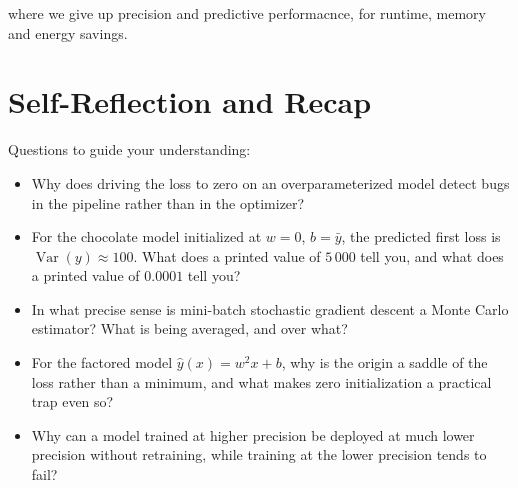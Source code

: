 \vfill
{} where we give up precision and predictive performacnce, for runtime, memory and energy savings.






\newpage
\section{Self-Reflection and Recap}

 Questions to guide your understanding:
\begin{itemize}
    \item Why does driving the loss to zero on an overparameterized model detect bugs in the pipeline rather than in the optimizer?
    \item For the chocolate model initialized at $w = 0$, $b = \bar{y}$, the predicted first loss is $\operatorname{Var}(y) \approx 100$. What does a printed value of $5\,000$ tell you, and what does a printed value of $0.0001$ tell you?
    \item In what precise sense is mini-batch stochastic gradient descent a Monte Carlo estimator? What is being averaged, and over what?
    \item For the factored model $\hat{y}(x) = w^2 x + b$, why is the origin a saddle of the loss rather than a minimum, and what makes zero initialization a practical trap even so?
    \item Why can a model trained at higher precision be deployed at much lower precision without retraining, while training at the lower precision tends to fail?
\end{itemize}

